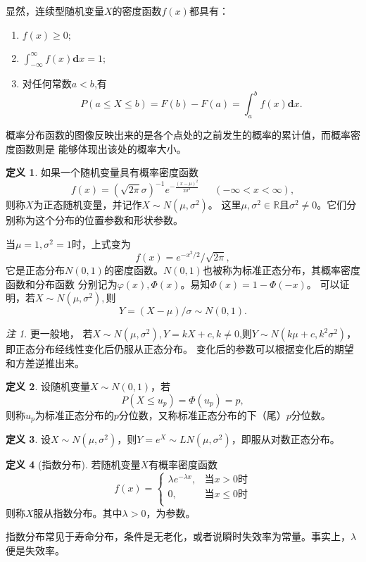 \documentclass[a4paper,11pt]{article}%
\theoremstyle{remark}
\newtheorem*{remark}{注}
\theoremstyle{remark}
\theoremstyle{definition}
\theoremstyle{definition}
\newtheorem*{definition}{定义}
\theoremstyle{plain}
\begin{document}
显然，连续型随机变量$X$的密度函数$f(x)$都具有：
\begin{enumerate}
    \item$f(x)\geq 0;$
    \item$\int^{\infty}_{-\infty}f(x)\mathbf{d}x=1;$
    \item 对任何常数$a<b$,有
    \[P(a\leq X\leq b)=F(b)-F(a)=\int^b_af(x)\mathbf{d}x.\]
\end{enumerate}
概率分布函数的图像反映出来的是各个点处的之前发生的概率的累计值，而概率密度函数则是
能够体现出该处的概率大小。
\begin{definition}
    如果一个随机变量具有概率密度函数
    \[f(x)=(\sqrt{2\pi}\sigma)^{-1}e^{-\frac{(x-\mu)^2}{2\sigma^2}}\phantom{111}(-\infty<x<\infty),\]
    则称$X$为正态随机变量，并记作$X\sim N(\mu,\sigma^2)$。
    这里$\mu,\sigma^2\in \mathbb{R}$且$\sigma^2\neq 0$。它们分别称为这个分布的位置参数和形状参数。
\end{definition}
当$\mu =1,\sigma^2=1$时，上式变为
\[f(x)=e^{-x^2/2}/\sqrt{2\pi},\]
它是正态分布$N(0,1)$的密度函数。$N(0,1)$也被称为标准正态分布，其概率密度函数和分布函数
分别记为$\varphi(x),\Phi(x)$。易知$\Phi(x)=1-\Phi(-x)$。
可以证明，若$X\sim N(\mu,\sigma^2),$则
\[Y= (X-\mu)/\sigma \sim N(0,1).\]
\begin{remark}
    更一般地， 若$X\sim N(\mu,\sigma^2),Y=kX+c,k\neq 0$,则$Y\sim N(k\mu+c,k^2\sigma^2)$，即正态分布经线性变化后仍服从正态分布。
    变化后的参数可以根据变化后的期望和方差逆推出来。
\end{remark}
\begin{definition}
    设随机变量$X\sim N(0,1)$，若
    \[P(X\leq u_p)=\Phi(u_p)=p,\]
    则称$u_p$为标准正态分布的$p$分位数，又称标准正态分布的下（尾）$p$分位数。
\end{definition}
\begin{definition}
    设$X\sim N(\mu,\sigma^2)$，则$Y=e^X\sim LN(\mu,\sigma^2)$，即服从对数正态分布。
\end{definition}
\begin{definition}[指数分布]
   若随机变量$X$有概率密度函数
   \[f(x)=\begin{cases}
    \lambda e^{-\lambda x}, &\text{当}x>0 \text{时}\\
    0,&\text{当}x\leq 0 \text{时}\\
   \end{cases}\] 
   则称$X$服从指数分布。其中$\lambda>0$，为参数。
\end{definition}
指数分布常见于寿命分布，条件是无老化，或者说瞬时失效率为常量。事实上，$\lambda$
便是失效率。
\end{document}
